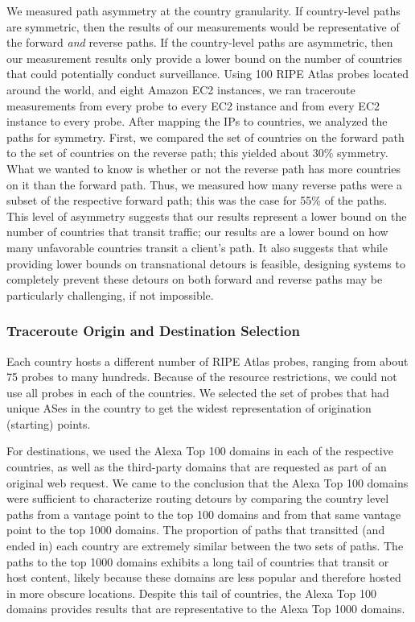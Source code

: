 We measured path asymmetry at the country
granularity. If country-level paths are symmetric, then the results of
our measurements would be representative of the forward {\it and}
reverse paths. If the country-level paths are asymmetric, then our
measurement results only provide a lower bound on the number of countries
that could potentially conduct surveillance.  Using 100 RIPE Atlas
probes located around the world, and eight Amazon EC2 instances, we ran
traceroute measurements from every probe to every EC2 instance and from
every EC2 instance to every probe.  After mapping the IPs to countries,
we analyzed the paths for symmetry.  First, we compared the set of
countries on the forward path to the set of countries on the reverse
path; this yielded about 30\% symmetry.  What we wanted to know is
whether or not the reverse path has more countries on it than the
forward path.  Thus, we measured how many reverse paths were a subset of the
respective forward path; this was the case for 55\% of the paths.   
This level of asymmetry suggests that our results represent a lower
bound on the number of countries that transit traffic; our results are a
lower bound on how many unfavorable countries transit a client's
path. It also suggests that while providing lower bounds on
transnational detours is feasible, designing systems to completely
prevent these detours on both forward and reverse paths may be particularly
challenging, if not impossible. 

\subsubsection{Traceroute Origin and Destination Selection}

Each country hosts a different number of RIPE Atlas probes, ranging
from about 75 probes to many hundreds.  Because of the resource
restrictions, we could not use all probes in each of the countries.  We
selected the set of probes that had unique ASes in the country to get
the widest representation of origination (starting) points.

For destinations, we used the Alexa Top 100 domains in each of the
respective countries, as well as the third-party domains that are
requested as part of an original web request.  We came to the conclusion that 
the Alexa Top 100 domains were sufficient to characterize routing detours by comparing 
the country level paths from a vantage point to the top 100 domains and from that 
same vantage point to the top 1000 domains.  The proportion of paths that transitted 
(and ended in) each country are extremely similar between the two sets of paths.  The 
paths to the top 1000 domains exhibits a long tail of countries that transit or host content, 
likely because these domains are less popular and therefore hosted in more obscure locations.  
Despite this tail of countries, the Alexa Top 100 domains provides results that are 
representative to the Alexa Top 1000 domains.

